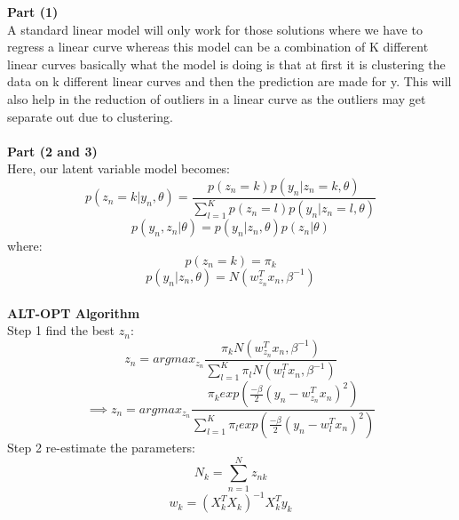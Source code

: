 \documentclass[a4paper,11pt]{article}
\begin{document}
\begin{mlsolution}
\noindent
\textbf{Part (1)}\\
A standard linear model will only work for those solutions where we have to regress a linear curve whereas this model can be a combination of K different linear curves basically what the model is doing is that at first it is clustering the data on k different linear curves and then the prediction are made for y. This will also help in the reduction of outliers in a linear curve as the outliers may get separate out due to clustering. \\ \\
\textbf{Part (2 and 3)}\\
Here, our latent variable model becomes:
\begin{equation}
  p(z_{n}=k|y_{n},\theta) = \frac{p(z_{n}=k)p(y_{n}|z_{n}=k, \theta)}{\sum_{l=1}^{K}p(z_{n}=l)p(y_{n}|z_{n}=l, \theta)}
\end{equation}
\begin{equation}
  p(y_{n}, z_{n}|\theta) = p(y_{n}|z_{n},\theta)p(z_{n}|\theta)
\end{equation}
where:
\begin{equation}
  p(z_{n}=k) = \pi_{k}
\end{equation}
\begin{equation}
  p(y_{n}|z_{n},\theta) = N(w_{z_{n}}^{T}x_{n}, \beta^{-1})
\end{equation} \\
\textbf{ALT-OPT Algorithm}\\
Step 1 find the best $z_{n}$: \\
\begin{equation}
  z_{n} = argmax_{z_{n}}\frac{\pi_{k}N(w_{z_{n}}^{T}x_{n}, \beta^{-1})}{\sum_{l=1}^{K}\pi_{l}N(w_{l}^{T}x_{n}, \beta^{-1})}
\end{equation}
\begin{equation}
  \implies z_{n} = argmax_{z_{n}}\frac{\pi_{k}exp(\frac{-\beta}{2}(y_{n}-w_{z_{n}}^{T}x_{n})^{2})}{\sum_{l=1}^{K}\pi_{l}exp(\frac{-\beta}{2}(y_{n}-w_{l}^{T}x_{n})^{2})}
\end{equation}
Step 2 re-estimate the parameters: \\
\begin{equation}
  N_{k} = \sum_{n=1}^{N}z_{nk}
\end{equation}
\begin{equation}
  w_{k} = (X_{k}^{T}X_{k})^{-1}X_{k}^{T}y_{k}
\end{equation}
\begin{equation}

\end{equation}
\end{mlsolution}
\end{document}
